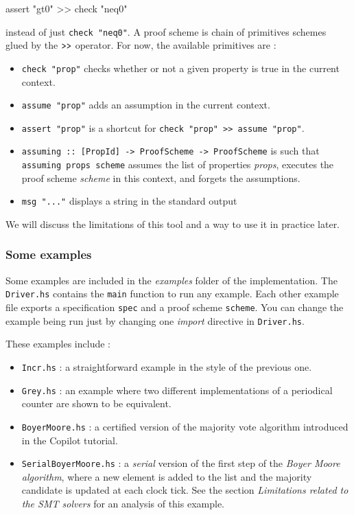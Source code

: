 \begin{code}
assert "gt0" >> check "neq0"
\end{code}


instead of just \texttt{check "neq0"}. A proof scheme is chain of
primitives schemes glued by the $\texttt{\textgreater{}\textgreater{}}$
operator. For now, the available primitives are :

\begin{itemize}
\itemsep1pt\parskip0pt
\item
  \texttt{check "prop"} checks whether or not a given property is true
  in the current context.
\item
  \texttt{assume "prop"} adds an assumption in the current context.
\item
  \texttt{assert "prop"} is a shortcut for
  \texttt{check "prop" \textgreater{}\textgreater{} assume "prop"}.
\item
  \texttt{assuming :: {[}PropId{]} -\textgreater{} ProofScheme -\textgreater{} ProofScheme}
  is such that \texttt{assuming props scheme} assumes the list of
  properties \emph{props}, executes the proof scheme \emph{scheme} in
  this context, and forgets the assumptions.
\item
  \texttt{msg "..."} displays a string in the standard output
\end{itemize}

We will discuss the limitations of this tool and a way to use it in
practice later.

\subsubsection{Some examples}\label{some-examples}

Some examples are included in the \emph{examples} folder of the implementation. The \texttt{Driver.hs}
contains the \texttt{main} function to run any example. Each other
example file exports a specification \texttt{spec} and a proof scheme
\texttt{scheme}. You can change the example being run just by changing
one \emph{import} directive in \texttt{Driver.hs}.

These examples include :

\begin{itemize}
\itemsep1pt\parskip0pt
\item
  \texttt{Incr.hs} : a straightforward example in the style of the
  previous one.
\item
  \texttt{Grey.hs} : an example where two different implementations of a
  periodical counter are shown to be equivalent.
\item
  \texttt{BoyerMoore.hs} : a certified version of the majority vote
  algorithm introduced in the Copilot tutorial.
\item
  \texttt{SerialBoyerMoore.hs} : a \emph{serial} version of the first
  step of the \emph{Boyer Moore algorithm}, where a new element is added
  to the list and the majority candidate is updated at each clock tick.
  See the section \emph{Limitations related to the SMT solvers} for an
  analysis of this example.
\end{itemize}

